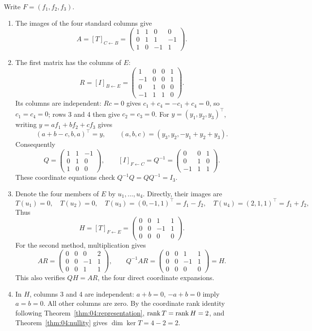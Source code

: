 \begin{solution}
Write \(F=(f_1,f_2,f_3)\).
\begin{enumerate}
\item The images of the four standard columns give
\[
A=[T]_{C\leftarrow B}
=\begin{pmatrix}1&1&0&0\\0&1&1&-1\\1&0&-1&1\end{pmatrix}.
\]
\item The first matrix has the columns of \(E\):
\[
R=[I]_{B\leftarrow E}
=\begin{pmatrix}1&0&0&1\\-1&0&0&1\\0&1&0&0\\-1&1&1&0\end{pmatrix}.
\]
Its columns are independent: \(Rc=0\) gives
\(c_1+c_4=-c_1+c_4=0\), so \(c_1=c_4=0\);
rows 3 and 4 then give \(c_2=c_3=0\).
For \(y=(y_1,y_2,y_3)^\top\), writing \(y=af_1+bf_2+cf_3\) gives
\[
(a+b-c,b,a)^\top=y,\qquad (a,b,c)=(y_3,y_2,-y_1+y_2+y_3).
\]
Consequently
\[
Q=\begin{pmatrix}1&1&-1\\0&1&0\\1&0&0\end{pmatrix},\qquad
[I]_{F\leftarrow C}=Q^{-1}
=\begin{pmatrix}0&0&1\\0&1&0\\-1&1&1\end{pmatrix}.
\]
These coordinate equations check \(Q^{-1}Q=QQ^{-1}=I_3\).
\item Denote the four members of \(E\) by \(u_1,\ldots,u_4\).
Directly, their images are
\[
T(u_1)=0,\quad T(u_2)=0,\quad
T(u_3)=(0,-1,1)^\top=f_1-f_2,\quad
T(u_4)=(2,1,1)^\top=f_1+f_2,
\]
Thus
\[
H=[T]_{F\leftarrow E}=
\begin{pmatrix}0&0&1&1\\0&0&-1&1\\0&0&0&0\end{pmatrix}.
\]
For the second method, multiplication gives
\[
AR=\begin{pmatrix}0&0&0&2\\0&0&-1&1\\0&0&1&1\end{pmatrix},
\qquad Q^{-1}AR=
\begin{pmatrix}0&0&1&1\\0&0&-1&1\\0&0&0&0\end{pmatrix}=H.
\]
This also verifies \(QH=AR\), the four direct coordinate expansions.
\item In \(H\), columns 3 and 4 are independent:
\(a+b=0\), \(-a+b=0\) imply \(a=b=0\).
All other columns are zero. By the coordinate rank identity following
Theorem~\ref{thm:04:representation},
\(\operatorname{rank} T=\operatorname{rank} H=2\), and Theorem~\ref{thm:04:nullity} gives
\(\dim\ker T=4-2=2\).
\end{enumerate}
\end{solution}

